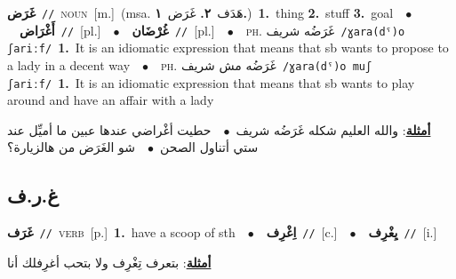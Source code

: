 \documentclass[10pt,a4paper,twoside]{article} %
\begin{document}
\begin{multicols}{2}
{\setlength\topsep{0pt}\textbf{\foreignlanguage{arabic}{غَرَض}}\ {\color{gray}\texttt{//}\color{black}}\ \textsc{noun}\ [m.]\ \color{gray}(msa. \foreignlanguage{arabic}{هَدَف}~\foreignlanguage{arabic}{\textbf{٢.}}  \foreignlanguage{arabic}{غَرَض}~\foreignlanguage{arabic}{\textbf{١.}})\color{black}\ \textbf{1.}~thing  \textbf{2.}~stuff  \textbf{3.}~goal\ \ $\bullet$\ \ \setlength\topsep{0pt}\textbf{\foreignlanguage{arabic}{أَغْرَاض}}\ {\color{gray}\texttt{//}\color{black}}\ [pl.]\ \ $\bullet$\ \ \setlength\topsep{0pt}\textbf{\foreignlanguage{arabic}{غُرْضَان}}\ {\color{gray}\texttt{//}\color{black}}\ [pl.]\ \ $\bullet$\ \ \textsc{ph.} \color{gray} \foreignlanguage{arabic}{غَرَضُه شريف}\color{black}\ {\color{gray}\texttt{/{\sffamily ɣara(dˤ)o ʃariːf}/}\color{black}}\ \textbf{1.}~It is an idiomatic expression that means that sb wants to propose to a lady in a decent way\ \ $\bullet$\ \ \textsc{ph.} \color{gray} \foreignlanguage{arabic}{غَرَضُه مش شريف}\color{black}\ {\color{gray}\texttt{/{\sffamily ɣara(dˤ)o muʃ ʃariːf}/}\color{black}}\ \textbf{1.}~It is an idiomatic expression that means that sb wants to play around and have an affair with a lady\  \begin{flushright}\color{gray}\foreignlanguage{arabic}{\textbf{\underline{\foreignlanguage{arabic}{أمثلة}}}: والله العليم شكله غَرَضُه شريف\ $\bullet$\ \  حطيت أغْراضي عندها عبين ما أميِّل عند ستي أتناول الصحن\ $\bullet$\ \  شو الغَرَض من هالزيارة؟}\end{flushright}\color{black}} \vspace{2mm}

\vspace{-3mm}
\subsection*{\color{blue}\foreignlanguage{arabic}{غ.ر.ف}\color{blue}{}} 

{\setlength\topsep{0pt}\textbf{\foreignlanguage{arabic}{غَرَف}}\ {\color{gray}\texttt{//}\color{black}}\ \textsc{verb}\ [p.]\ \textbf{1.}~have a scoop of sth\ \ $\bullet$\ \ \setlength\topsep{0pt}\textbf{\foreignlanguage{arabic}{اِغْرِف}}\ {\color{gray}\texttt{//}\color{black}}\ [c.]\ \ $\bullet$\ \ \setlength\topsep{0pt}\textbf{\foreignlanguage{arabic}{يِغْرِف}}\ {\color{gray}\texttt{//}\color{black}}\ [i.]\  \begin{flushright}\color{gray}\foreignlanguage{arabic}{\textbf{\underline{\foreignlanguage{arabic}{أمثلة}}}: بتعرف تِغْرِف ولا بتحب أغرِفلك أنا}\end{flushright}\color{black}} \vspace{2mm}


\end{multicols}
\end{document}
